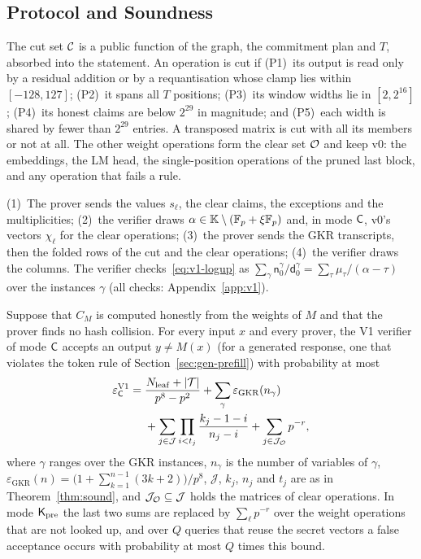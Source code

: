\subsection{Protocol and Soundness}

 The cut set $\mathcal{C}$ is a public function of the graph, the commitment plan and $T$,
absorbed into the statement. An operation is cut if (P1)~its output is read only by a residual
addition or by a requantisation whose clamp lies within $[-128, 127]$; (P2)~it spans all $T$
positions; (P3)~its window widths lie in $[2, 2^{16}]$; (P4)~its honest claims are below
$2^{29}$ in magnitude; and (P5)~each width is shared by fewer than $2^{29}$ entries. A transposed
matrix is cut with all its members or not at all. The other weight operations form the clear set
$\mathcal{O}$ and keep v0: the embeddings, the LM head, the single-position operations of the pruned last
block, and any operation that fails a rule.

 (1)~The prover sends the values $s_\ell$, the
clear claims, the exceptions and the multiplicities; (2)~the verifier draws $\alpha \in \mathbb{K}
\setminus (\mathbb{F}_p + \xi\mathbb{F}_p)$ and, in mode $\mathsf{C}$, v0's vectors $\chi_\ell$ for the clear operations;
(3)~the prover sends the GKR transcripts, then the folded rows of the cut and the clear operations;
(4)~the verifier draws the columns. The verifier checks~\eqref{eq:v1-logup} as
$\sum_\gamma \mathsf n_0^\gamma / \mathsf d_0^\gamma = \sum_\tau \mu_\tau / (\alpha - \tau)$ over
the instances $\gamma$ (all checks: Appendix~\ref{app:v1}).

\begin{theorem}[soundness of V1]
  \label{thm:v1}
  Suppose that $C_M$ is computed honestly from the weights of $M$ and that the prover finds no hash
  collision. For every input $x$ and every prover, the V1 verifier of mode $\mathsf{C}$ accepts an output
  $y \neq M(x)$ (for a generated response, one that violates the token rule of
  Section~\ref{sec:gen-prefill}) with probability
  at most
  \[
    \begin{aligned}
      \varepsilon^{\mathrm{V1}}_{\mathsf{C}} = {} & \frac{N_{\mathrm{leaf}} + |\mathcal{T}|}{p^8 - p^2}
        + \sum_{\gamma} \varepsilon_{\mathrm{GKR}}(n_\gamma) \\
      & + \sum_{j \in \mathcal J} \prod_{i < t_j} \frac{k_j - 1 - i}{n_j - i}
        + \sum_{j \in \mathcal J_{\mathcal{O}}} p^{-r},
    \end{aligned}
  \]
  where $\gamma$ ranges over the GKR instances, $n_\gamma$ is the number of variables of
  $\gamma$, $\varepsilon_{\mathrm{GKR}}(n) = \big(1 + \sum_{k=1}^{n-1} (3k+2)\big)/p^8$, $\mathcal
  J$, $k_j$, $n_j$ and $t_j$ are as in Theorem~\ref{thm:sound}, and $\mathcal J_{\mathcal{O}} \subseteq
  \mathcal J$ holds the matrices of clear operations. In mode $\mathsf{K}_{\mathrm{pre}}$ the last two sums are replaced
  by $\sum_\ell p^{-r}$ over the weight operations that are not looked up, and over $Q$ queries
  that reuse the secret vectors a false acceptance occurs with probability at most $Q$ times this
  bound.
\end{theorem}

